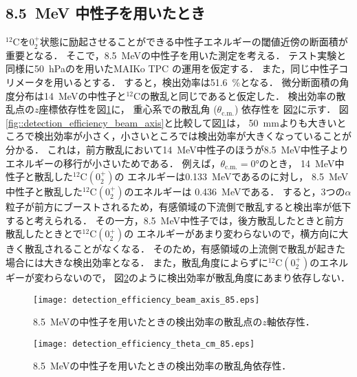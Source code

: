 \documentclass[../master]{subfiles}
\begin{document}
\subsection{8.5~MeV 中性子を用いたとき}
${}^{12}\mathrm{C}$を$0_2^+$状態に励起させることができる中性子エネルギーの閾値近傍の断面積が重要となる．
そこで，\SI{8.5}{\mega\electronvolt}の中性子を用いた測定を考える．
テスト実験と同様に\SI{50}{\hecto\pascal}の\isoButaneHydro を用いたMAIKo TPC の運用を仮定する．
また，同じ中性子コリメータを用いるとする．
すると，検出効率は\SI{51.6}{\percent}となる．
微分断面積の角度分布は\SI{14}{\mega\electronvolt}の中性子と${}^{12}\mathrm{C}$の散乱と同じであると仮定した．
検出効率の散乱点の$z$座標依存性を図\ref{fig::detection_efficiency_beam_axis_low}に，
重心系での散乱角 ($\theta_{\text{c.m.}}$) 依存性を
図\ref{fig::detection_efficiency_theta_cm_low}に示す．
図\ref{fig::detection_efficiency_beam_axis}と比較して図\ref{fig::detection_efficiency_beam_axis_low}は，
\SI{50}{\milli\metre}よりも大きいところで検出効率が小さく，小さいところでは検出効率が大きくなっていることが分かる．
これは，前方散乱において\SI{14}{\mega\electronvolt}中性子のほうが\SI{8.5}{\mega\electronvolt}中性子より
エネルギーの移行が小さいためである．
例えば，$\theta_{\text{c.m.}} = \ang{0}$のとき，
\SI{14}{\mega\electronvolt}中性子と散乱した${}^{12}\mathrm{C}(0_2^+)$の
エネルギーは\SI{0.133}{\mega\electronvolt}であるのに対し，
\SI{8.5}{\mega\electronvolt}中性子と散乱した${}^{12}\mathrm{C}(0_2^+)$のエネルギーは
\SI{0.436}{\mega\electronvolt}である．
すると，3つの$\alpha$粒子が前方にブーストされるため，有感領域の下流側で散乱すると検出率が低下すると考えられる．
その一方，\SI{8.5}{\mega\electronvolt}中性子では，後方散乱したときと前方散乱したときとで${}^{12}\mathrm{C}(0_2^+)$の
エネルギーがあまり変わらないので，横方向に大きく散乱されることがなくなる．
そのため，有感領域の上流側で散乱が起きた場合には大きな検出効率となる．
また，散乱角度によらずに${}^{12}\mathrm{C}(0_2^+)$のエネルギーが変わらないので，
図\ref{fig::detection_efficiency_theta_cm_low}のように検出効率が散乱角度にあまり依存しない．
\begin{figure}
  \centering
  \texttt{[image: detection\_efficiency\_beam\_axis\_85.eps]}
  \caption{\SI{8.5}{\mega\electronvolt}の中性子を用いたときの検出効率の散乱点の$z$軸依存性．}
  \label{fig::detection_efficiency_beam_axis_low}
\end{figure}
\begin{figure}
  \centering
  \texttt{[image: detection\_efficiency\_theta\_cm\_85.eps]}
  \caption{\SI{8.5}{\mega\electronvolt}の中性子を用いたときの検出効率の散乱角依存性．}
  \label{fig::detection_efficiency_theta_cm_low}
\end{figure}
\end{document}
